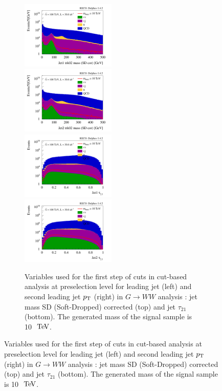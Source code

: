 \documentclass{cernrep}
\begin{document}
\begin{figure}[!htb]
\begin{figure}[!htb]\centering
\includegraphics[width=0.495\textwidth]{Fig/RSGww/cut/Jet1_trk02_SD_Cor_m_sel0_nostack_log.png}
\includegraphics[width=0.495\textwidth]{Fig/RSGww/cut/Jet2_trk02_SD_Cor_m_sel0_nostack_log.png}
\includegraphics[width=0.495\textwidth]{Fig/RSGww/cut/Jet1_tau21_sel0_nostack_log.png}
\includegraphics[width=0.495\textwidth]{Fig/RSGww/cut/Jet2_tau21_sel0_nostack_log.png}
\caption{Variables used for the first step of cuts in cut-based analysis at preselection level for leading jet (left) and second leading jet $p\sb{\scriptstyle\mathrm{T}}$ (right) in $G \rightarrow WW$ analysis : jet mass SD (Soft-Dropped) corrected (top) and jet $\tau_{21}$ (bottom). The generated mass of the signal sample is 10 $\TeV$.}
\label{fig:RSGww_sel0_cut}
\end{figure}


\end{figure}
\end{document}
